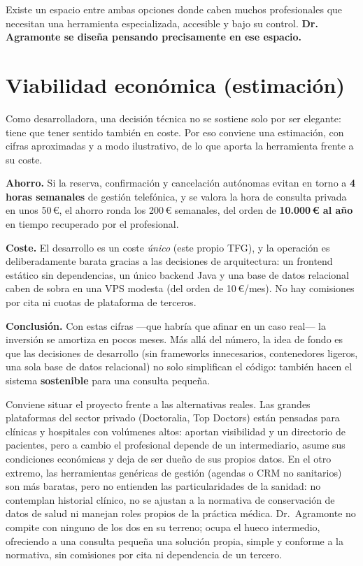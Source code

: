 \documentclass[12pt,a4paper]{report}
\begin{document}
Existe un espacio entre ambas opciones donde caben muchos profesionales que necesitan una herramienta especializada, accesible y bajo su control. \textbf{Dr. Agramonte se diseña pensando precisamente en ese espacio.}

\section{Viabilidad económica (estimación)}

Como desarrolladora, una decisión técnica no se sostiene solo por ser elegante: tiene que tener sentido también en coste. Por eso conviene una estimación, con cifras aproximadas y a modo ilustrativo, de lo que aporta la herramienta frente a su coste.

\textbf{Ahorro.} Si la reserva, confirmación y cancelación autónomas evitan en torno a \textbf{4 horas semanales} de gestión telefónica, y se valora la hora de consulta privada en unos 50\,€, el ahorro ronda los 200\,€ semanales, del orden de \textbf{10.000\,€ al año} en tiempo recuperado por el profesional.

\textbf{Coste.} El desarrollo es un coste \emph{único} (este propio TFG), y la operación es deliberadamente barata gracias a las decisiones de arquitectura: un frontend estático sin dependencias, un único backend Java y una base de datos relacional caben de sobra en una VPS modesta (del orden de 10\,€/mes). No hay comisiones por cita ni cuotas de plataforma de terceros.

\textbf{Conclusión.} Con estas cifras —que habría que afinar en un caso real— la inversión se amortiza en pocos meses. Más allá del número, la idea de fondo es que las decisiones de desarrollo (sin frameworks innecesarios, contenedores ligeros, una sola base de datos relacional) no solo simplifican el código: también hacen el sistema \textbf{sostenible} para una consulta pequeña.

Conviene situar el proyecto frente a las alternativas reales. Las grandes plataformas del sector privado (Doctoralia, Top Doctors) están pensadas para clínicas y hospitales con volúmenes altos: aportan visibilidad y un directorio de pacientes, pero a cambio el profesional depende de un intermediario, asume sus condiciones económicas y deja de ser dueño de sus propios datos. En el otro extremo, las herramientas genéricas de gestión (agendas o CRM no sanitarios) son más baratas, pero no entienden las particularidades de la sanidad: no contemplan historial clínico, no se ajustan a la normativa de conservación de datos de salud ni manejan roles propios de la práctica médica. Dr.\ Agramonte no compite con ninguno de los dos en su terreno; ocupa el hueco intermedio, ofreciendo a una consulta pequeña una solución propia, simple y conforme a la normativa, sin comisiones por cita ni dependencia de un tercero.
\end{document}

